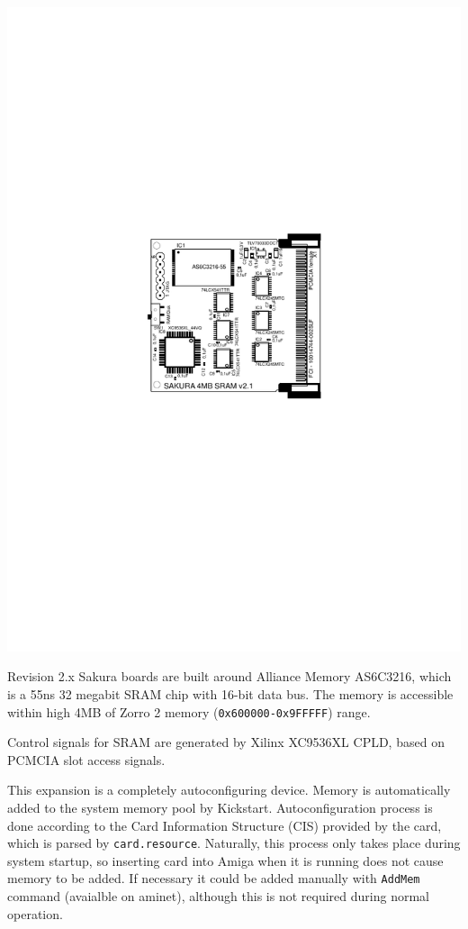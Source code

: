 \documentclass[10pt,a4paper]{article}
\begin{document}
\begin{center}
\includegraphics{board21layout.pdf}
\end{center}

Revision 2.x Sakura boards are built around Alliance Memory AS6C3216, which is a 55ns 32 megabit SRAM chip with 16-bit data bus. The memory is accessible within high 4MB of Zorro 2 memory ({\tt 0x600000-0x9FFFFF}) range.

Control signals for SRAM are generated by Xilinx XC9536XL CPLD, based on PCMCIA slot access signals.

This expansion is a completely autoconfiguring device. Memory is automatically added to the system memory pool by Kickstart. Autoconfiguration process is done according to the Card Information Structure (CIS) provided by the card, which is parsed by {\tt card.resource}. Naturally, this process only takes place during system startup, so inserting card into Amiga when it is running does not cause memory to be added. If necessary it could be added manually with {\tt AddMem} command (avaialble on aminet), although this is not required during normal operation.
\end{document}

